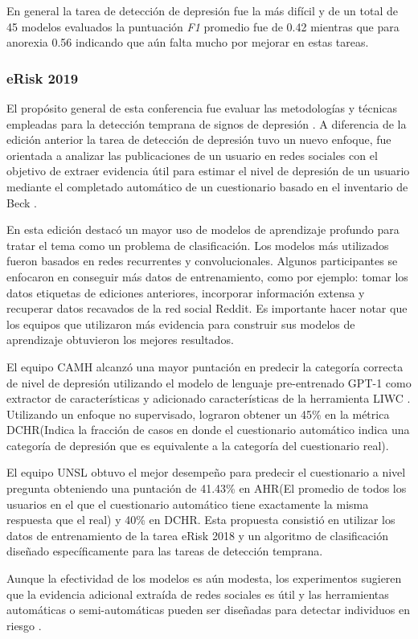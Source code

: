 En general la tarea de detección de depresión fue la más difícil y de un total de 45 modelos evaluados la puntuación \textit{F1} promedio fue de 0.42 mientras que para anorexia 0.56 indicando que aún falta mucho por mejorar en estas tareas. 

\subsubsection{eRisk 2019}
El propósito general de esta conferencia fue evaluar las metodologías y técnicas empleadas para la detección temprana de signos de depresión \citep{Losada2019}. A diferencia de la edición anterior la tarea de detección de depresión tuvo un nuevo enfoque, fue orientada a analizar las publicaciones de un usuario en redes sociales con el objetivo de extraer evidencia útil para estimar el nivel de depresión de un usuario mediante el completado automático de un cuestionario basado en el inventario de Beck \cite{beck1961inventory}. 

En esta edición destacó un mayor uso de modelos de aprendizaje profundo para tratar el tema como un problema de clasificación. Los modelos más utilizados fueron basados en redes recurrentes y convolucionales. Algunos participantes se enfocaron en conseguir más datos de entrenamiento, como por ejemplo:  tomar los datos etiquetas de ediciones anteriores, incorporar información extensa y recuperar datos recavados de la red social Reddit. Es importante hacer notar que los equipos que utilizaron más evidencia para construir sus modelos de aprendizaje obtuvieron los mejores resultados.

El equipo CAMH \citep{Abed-Esfahani2019} alcanzó una mayor puntación en predecir la categoría correcta de nivel de depresión utilizando el modelo de lenguaje pre-entrenado GPT-1 como extractor de características y adicionado características de la herramienta LIWC \citep{pennebaker2001linguistic} . Utilizando un enfoque no supervisado, lograron obtener un 45\% en la métrica DCHR(Indica la fracción de casos en donde el cuestionario automático indica  una categoría de depresión que es equivalente a la categoría del cuestionario real).

El equipo UNSL \citep{Burdisso2019} obtuvo el mejor desempeño para predecir el cuestionario a nivel pregunta obteniendo una puntación de 41.43\% en AHR(El promedio de todos los usuarios en el que el cuestionario automático tiene exactamente la misma respuesta que el real) y 40\% en DCHR.  Esta propuesta consistió en utilizar los datos de entrenamiento de la tarea eRisk 2018 y un algoritmo de clasificación diseñado específicamente para las tareas de detección temprana.

Aunque la efectividad de los modelos es aún modesta, los experimentos sugieren que la evidencia adicional extraída de redes sociales es útil y las herramientas automáticas o semi-automáticas pueden ser diseñadas para detectar individuos en riesgo \citep{losada2019overview}.